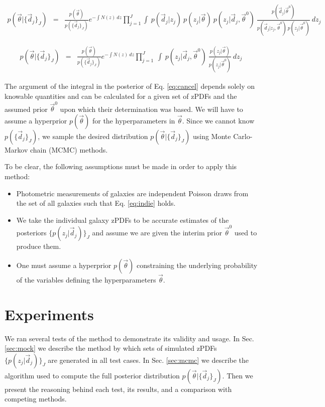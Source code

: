\documentclass[preprint]{aastex}
\begin{document}
\begin{eqnarray}
\label{eq:expand}
p(\vec{\theta}|\{\vec{d}_{j}\}_{J}) &=& \frac{p(\vec{\theta})}{p(\{\vec{d}_{j}\}_{J})}e^{-\int N(z)\ dz}\prod_{j=1}^{J}\int\ p(\vec{d}_{j}|z_{j})\ p(z_{j}|\vec{\theta})\ p(z_{j}|\vec{d}_{j},\vec{\theta}^{0})\ \frac{p(\vec{d}_{j}|\vec{\theta}^{0})}{p(\vec{d}_{j}|z_{j},\vec{\theta}^{0})\ p(z_{j}|\vec{\theta}^{0})}\ dz_{j}
\end{eqnarray}

\begin{eqnarray}
\label{eq:cancel}
p(\vec{\theta}|\{\vec{d}_{j}\}_{J}) &=& \frac{p(\vec{\theta})}{p(\{\vec{d}_{j}\}_{J})}e^{-\int N(z)\ dz}\prod_{j=1}^{J}\ \int\ p(z_{j}|\vec{d}_{j},\vec{\theta}^{0})\ \frac{p(z_{j}|\vec{\theta})}{p(z_{j}|\vec{\theta}^{0})}\ dz_{j}
\end{eqnarray}

The argument of the integral in the posterior of Eq. \ref{eq:cancel} depends solely on knowable quantities and can be calculated for a given set of zPDFs and the assumed prior $\vec{\theta}^{0}$ upon which their determination was based.  We will have to assume a hyperprior $p(\vec{\theta})$ for the hyperparameters in $\vec{\theta}$.  Since we cannot know $p(\{\vec{d}_{j}\}_{J})$, we sample the desired distribution $p(\vec{\theta}|\{\vec{d}_{j}\}_{J})$ using Monte Carlo-Markov chain (MCMC) methods.  

To be clear, the following assumptions must be made in order to apply this method:

\begin{itemize}
\item Photometric measurements of galaxies are independent Poisson draws from the set of all galaxies such that Eq. \ref{eq:indie} holds.
\item We take the individual galaxy zPDFs to be accurate estimates of the posteriors $\{p(z_{j}|\vec{d}_{j})\}_{J}$ and assume we are given the interim prior $\vec{\theta}^{0}$ used to produce them.
\item One must assume a hyperprior $p(\vec{\theta})$ constraining the underlying probability of the variables defining the hyperparameters $\vec{\theta}$.
\end{itemize}

\section{Experiments}
\label{sec:exp}

We ran several tests of the method to demonstrate its validity and usage.  In Sec. \ref{sec:mock} we describe the method by which sets of simulated zPDFs $\{p(z_{j}|\vec{d}_{j})\}_{J}$ are generated in all test cases.  In Sec. \ref{sec:mcmc} we describe the algorithm used to compute the full posterior distribution $p(\vec{\theta}|\{\vec{d}_{j}\}_{J})$.  Then we present the reasoning behind each test, its results, and a comparison with competing methods.
\end{document}
